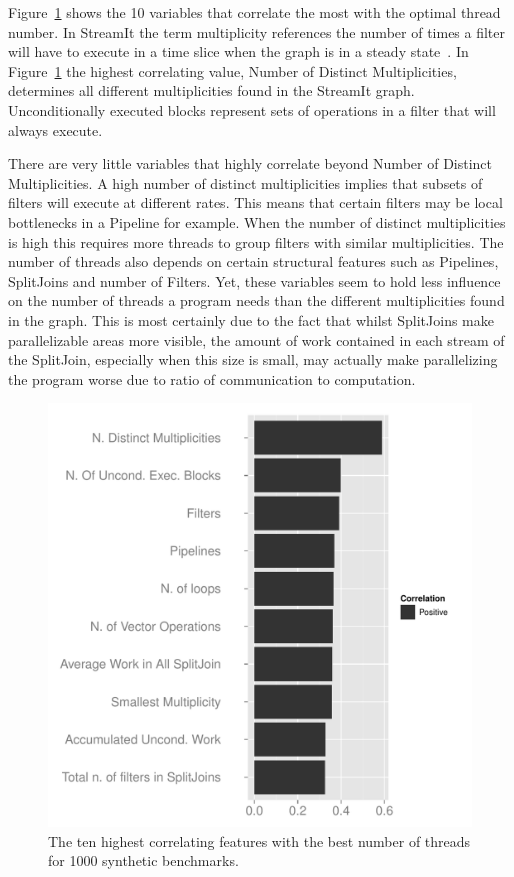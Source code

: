 Figure~\ref{fig:corr} shows the 10 variables that correlate the most with the optimal thread number.
In StreamIt the term multiplicity references the number of times a filter will have to execute in a time slice when the graph is in a steady state~\cite{gordon2002streamcomp}.
In Figure~\ref{fig:corr} the highest correlating value, Number of Distinct Multiplicities, determines all different multiplicities found in the StreamIt graph.
Unconditionally executed blocks represent sets of operations in a filter that will always execute.

There are very little variables that highly correlate beyond Number of Distinct Multiplicities.
A high number of distinct multiplicities implies that subsets of filters will execute at different rates.
This means that certain filters may be local bottlenecks in a Pipeline for example.
When the number of distinct multiplicities is high this requires more threads to group filters with similar multiplicities.
The number of threads also depends on certain structural features such as Pipelines, SplitJoins and number of Filters.
Yet, these variables seem to hold less influence on the number of threads a program needs than the different multiplicities found in the graph.
This is most certainly due to the fact that whilst SplitJoins make parallelizable areas more visible, the amount of work contained in each stream of the SplitJoin, especially when this size is small, may actually make parallelizing the program worse due to ratio of communication to computation.

\begin{figure}
  \includegraphics[width=1\textwidth]{streamit-paper/graphics/corrGraph.pdf}
  \caption{The ten highest correlating features with the best number of threads for 1000 synthetic benchmarks.}\label{fig:corr}
\end{figure}
 
